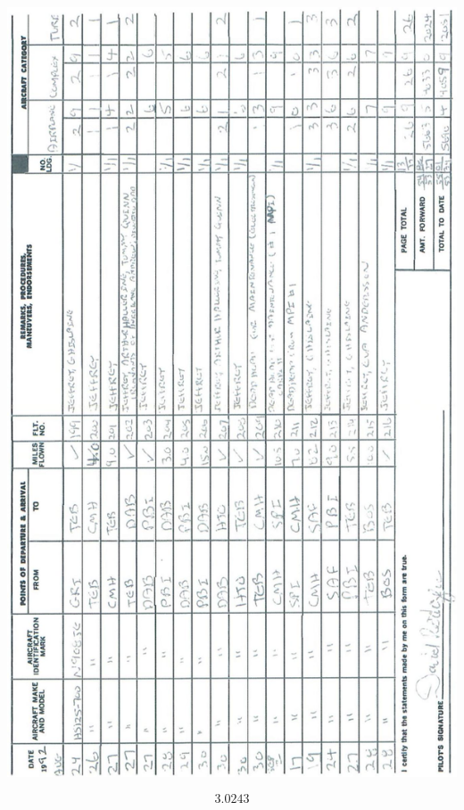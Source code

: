 \documentclass[10pt]{article}
\begin{document}
\begin{center}
\includegraphics[max width=\textwidth]{2025_02_27_dd68c3d38de88f0516d9g-017}
\end{center}

\[
3.0243
\]
\end{document}
